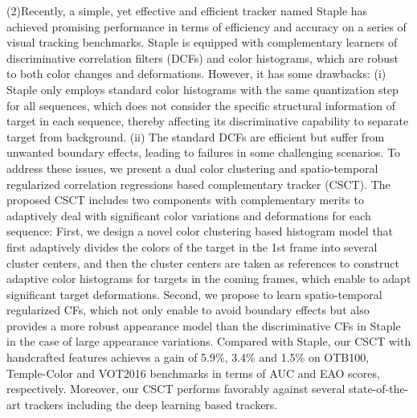 {(2)Recently, a simple, yet effective and efficient tracker named Staple has achieved promising performance in terms of efficiency and accuracy on a series of visual tracking benchmarks.
%
Staple is equipped with complementary learners of discriminative correlation filters (DCFs) and color histograms, which are robust to both color changes and deformations.
%
However, it has some drawbacks:
%
(i) Staple only employs standard color histograms with the same quantization step for all sequences, which does not consider the specific structural information of target in each sequence, thereby affecting its discriminative capability to separate target from background.
%
(ii) The standard DCFs are efficient but suffer from unwanted boundary effects, leading to failures in some challenging scenarios.
%
To address these issues, we present a dual color clustering and spatio-temporal regularized correlation regressions based complementary tracker (CSCT).
%
The proposed CSCT includes two components with complementary merits to adaptively deal with significant color variations and deformations for each sequence:
%
First, we design a novel color clustering based histogram model that first adaptively divides the colors of the target in the 1st frame into several cluster centers, and then the cluster centers are taken as references to construct adaptive color histograms for targets in the coming frames, which enable to adapt significant target deformations.
%
Second, we propose to learn spatio-temporal regularized CFs, which not only enable to avoid boundary effects but also provides a more robust appearance model than the discriminative CFs in Staple in the case of large appearance variations.
%
Compared with Staple, our CSCT with handcrafted features achieves a gain of 5.9\%, 3.4\% and 1.5\% on OTB100, Temple-Color and VOT2016 benchmarks in terms of AUC and EAO scores, respectively. Moreover, our CSCT performs favorably against several state-of-the-art trackers including the deep learning based trackers.


}

\makecover
